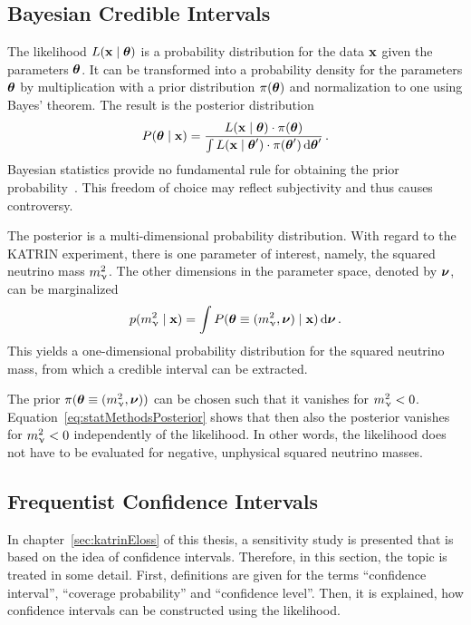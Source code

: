 \subsection{Bayesian Credible Intervals}
\label{sec:statMethodsUncertaintyIntervalsCredible}
The likelihood $L\giventhat{\dataVec}{\paramVec}$ is a probability distribution for the data $\boldsymbol{\mathbf{x}}$ given the parameters $\boldsymbol{\mathbf{\theta}}$. It can be transformed into a probability density for the parameters $\boldsymbol{\mathbf{\theta}}$ by multiplication with a prior distribution $\pi(\boldsymbol{\mathbf{\theta}})$ and normalization to one using Bayes' theorem. The result is the posterior distribution~\cite{ReviewOfParticlePhysics}
\begin{equation}
\label{eq:statMethodsPosterior}
	P\giventhat{\paramVec}{\dataVec} = 
		\frac{
			L\giventhat{\dataVec}{\paramVec}\cdot\pi(\paramVec)
		}{
			\int L\giventhat{\dataVec}{\paramVec^\prime}\cdot\pi(\paramVec^\prime) \d\paramVec^\prime
		}
	\fullstop
\end{equation}
Bayesian statistics provide no fundamental rule for obtaining the prior probability~\cite{ReviewOfParticlePhysics}. This freedom of choice may reflect subjectivity and thus causes controversy. 

The posterior is a multi-dimensional probability distribution. With regard to the KATRIN experiment, there is one parameter of interest, namely, the squared neutrino mass $m_\upnu^2$. The other dimensions in the parameter space, denoted by $\boldsymbol{\mathbf{\nu}}$, can be marginalized~\cite{ReviewOfParticlePhysics}
\begin{equation}
	p\giventhat{\nuMass^2}{\dataVec} = \int P\giventhat{\paramVec\equiv(\nuMass^2,\vect{\nu})}{\dataVec} \d \vect{\nu}
	\fullstop
\end{equation}
This yields a one-dimensional probability distribution for the squared neutrino mass, from which a credible interval can be extracted.

The prior $\pi(\boldsymbol{\mathbf{\theta}}\equiv(m_\upnu^2,\boldsymbol{\mathbf{\nu}}))$ can be chosen such that it vanishes for $m_\upnu^2<0$. Equation~\eqref{eq:statMethodsPosterior} shows that then also the posterior vanishes for $m_\upnu^2<0$ independently of the likelihood. In other words, the likelihood does not have to be evaluated for negative, unphysical squared neutrino masses.



\subsection{Frequentist Confidence Intervals}
\label{sec:statMethodsUncertaintyIntervalsConfidence}
In chapter~\ref{sec:katrinEloss} of this thesis, a sensitivity study is presented that is based on the idea of confidence intervals. Therefore, in this section, the topic is treated in some detail. First, definitions are given for the terms ``confidence interval'', ``coverage probability'' and ``confidence level''. Then, it is explained, how confidence intervals can be constructed using the likelihood. 

